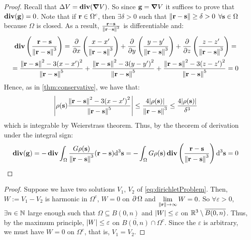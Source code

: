 \documentclass[../main.tex]{subfiles}
\begin{document}
\begin{proof}
  Recall that $\laplacian V=\div(\grad V)$. So since $\vf{g}=\grad V$ it suffices to prove that $\div(\vf{g})=0$. Note that if $\vf{r}\in\Omega^c$, then $\exists \delta>0$ such that $\norm{\vf{r}-\vf{s}}\geq\delta>0$ $\forall \vf{s}\in\Omega$ because $\Omega$ is closed. As a result, $\frac{\vf{r}-\vf{s}}{\norm{\vf{r}-\vf{s}}^3}$ is differentiable and:
  \begin{multline*}
    \div\left(\frac{\vf{r}-\vf{s}}{\norm{\vf{r}-\vf{s}}^3}\right)=\pdv{}{x}\left(\frac{x-x'}{\norm{\vf{r}-\vf{s}}^3}\right)+\pdv{}{y}\left(\frac{y-y'}{\norm{\vf{r}-\vf{s}}^3}\right)+\pdv{}{z}\left(\frac{z-z'}{\norm{\vf{r}-\vf{s}}^3}\right)=\\
    =\frac{\norm{\vf{r}-\vf{s}}^2-3{(x-x')}^2}{\norm{\vf{r}-\vf{s}}^5}+\frac{\norm{\vf{r}-\vf{s}}^2-3{(y-y')}^2}{\norm{\vf{r}-\vf{s}}^5}+\frac{\norm{\vf{r}-\vf{s}}^2-3{(z-z')}^2}{\norm{\vf{r}-\vf{s}}^5} =0
  \end{multline*}
  Hence, as in \cref{thm:conservative}, we have that:
  \begin{equation}
    \abs{\rho(\vf{s})\frac{\norm{\vf{{r}}-\vf{s}}^2-3{({x}-x')}^2}{\norm{\vf{{r}}-\vf{s}}^5}}\leq \frac{4\abs{\rho(\vf{s})}}{\norm{\vf{{r}}-\vf{s}}^3}\leq \frac{4\abs{\rho(\vf{s})}}{\delta^3}
  \end{equation}
  which is integrable by Weierstrass theorem. Thus, by the theorem of derivation under the integral sign:
  \begin{equation}
    \div(\vf{g})=-\div\int_\Omega\frac{G\rho(\vf{s})}{\norm{\vf{r}-\vf{s}}^3}(\vf{r}-\vf{s})\dd^3{\vf{s}}=-\int_\Omega G\rho(\vf{s})\div\left(\frac{\vf{r}-\vf{s}}{\norm{\vf{r}-\vf{s}}^3}\right)\dd^3{\vf{s}}=0
  \end{equation}
\end{proof}
\Dirichlet*
\begin{proof}
  Suppose we have two solutions $V_1$, $V_2$ of \cref{eq:dirichletProblem}. Then, $W:=V_1-V_2$ is harmonic in $\Omega^c$, $W=0$ on $\Fr{\Omega}$ and $\displaystyle\lim_{\norm{\vf{r}}\to\infty}W=0$. So $\forall\varepsilon>0$, $\exists n\in\NN$ large enough such that $\Omega \subseteq B(0,n)$ and $\abs{W}\leq \varepsilon$ on $\RR^3\setminus \overline{B(0,n)}$. Thus, by the maximum principle, $\abs{W}\leq \varepsilon$ on $\overline{B(0,n)}\cap \Omega^c$. Since the $\varepsilon$ is arbitrary, we must have $W=0$ on $\Omega^c$, that is, $V_1=V_2$.
\end{proof}
\propOrthoSphericalHarmonics*
\end{document}
